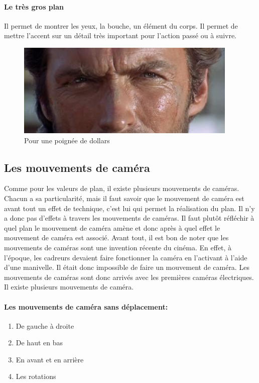 \documentclass{article}
\begin{document}
	\paragraph{Le très gros plan} Il permet de montrer les yeux, la bouche, un élément du corps. Il permet de mettre l'accent sur un détail très important pour l'action passé ou à suivre.

\begin{figure}[h]
\centering
\includegraphics[scale=0.4]{img/plan9.jpg}
\caption{Pour une poignée de dollars}
\label{fig:regle_tiers}
\end{figure}

\smallskip

\clearpage
	
	\subsection{Les mouvements de caméra}
Comme pour les valeurs de plan, il existe plusieurs mouvements de caméras. Chacun a sa particularité, mais il faut savoir que le mouvement de caméra est avant tout un effet de technique, c'est lui qui permet la réalisation du plan. Il n'y a donc pas d'effets à travers les mouvements de caméras. Il faut plutôt réfléchir à quel plan le mouvement de caméra amène et donc après à quel effet le mouvement de caméra est associé.
\smallskip
Avant tout, il est bon de noter que les mouvements de caméras sont une invention récente du cinéma. En effet, à l'époque, les cadreurs devaient faire fonctionner la caméra en l'activant à l'aide d'une manivelle. Il était donc impossible de faire un mouvement de caméra. Les mouvements de caméras sont donc arrivés avec les premières caméras électriques. Il existe plusieurs mouvements de caméra.

	\paragraph{Les mouvements de caméra sans déplacement:}

\begin{enumerate}
	\item De gauche à droite
	\item De haut en bas
	\item En avant et en arrière
	\item Les rotations
\end{enumerate}
\end{document}
